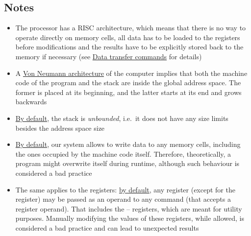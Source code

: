 \hypertarget{standard:notes}{
	\subsection{Notes}
}

\begin{itemize}
    \item The  processor has a RISC architecture,
    which means that there is no way to operate directly on memory cells,
    all data has to be loaded to the registers before modifications and
    the results have to be explicitly stored back to the memory if necessary
    (see \hyperlink{cmd:data_transfer}{Data transfer commands} for details)

    \item A \href{https://en.wikipedia.org/wiki/Von_Neumann_architecture}
    {Von Neumann architecture} of the  computer implies that
    both the machine code of the program and the stack are inside the
    global address space.
    The former is placed at its beginning, and the latter starts at its end
    and grows backwards

    \item \hyperlink{config}{By default}, the stack is \textit{unbounded}, 
    i.e.\ it does not have any size limits besides the address space size

    \item \hyperlink{config}{By default}, our system allows to write data 
    to any memory cells, including the ones occupied by the machine code itself.
    Therefore, theoretically, a program might overwrite itself during runtime,
    although such behaviour is considered a bad practice

    \item The same applies to the registers: \hyperlink{config}{by default}, 
    any register (except for the  register) may be passed as 
    an operand to any command (that accepts a register operand).
    That includes the -- registers, which are meant
    for utility purposes.
    Manually modifying the values of these registers, while allowed,
    is considered a bad practice and can lead to unexpected results
\end{itemize}
